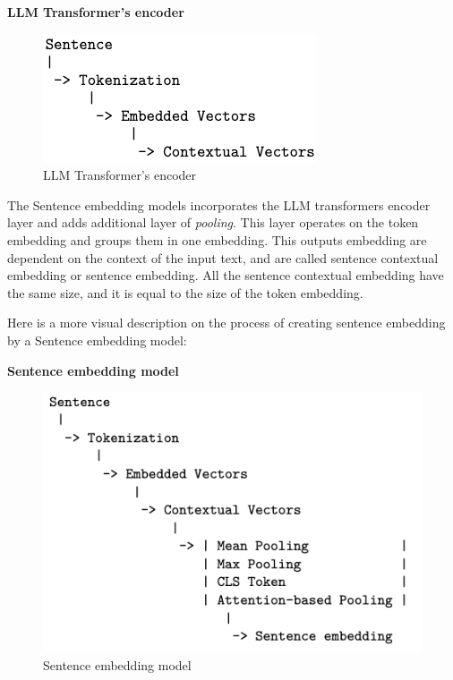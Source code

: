 \documentclass{wseas}
\begin{document}
\textbf{LLM Transformer's encoder}

\begin{figure}[htbp]{}
  \centering
  \includegraphics[width=\linewidth]{resources/v1/transformerEncoder.png}
  \caption{LLM Transformer's encoder}
  \label{fig:encoder_layer_figure}
\end{figure}

The Sentence embedding models incorporates the LLM transformers encoder
layer and adds additional layer of \emph{pooling}. This layer operates
on the token embedding and groups them in one embedding. This outputs
embedding are dependent on the context of the input text, and are called
sentence contextual embedding or sentence embedding. All the sentence
contextual embedding have the same size, and it is equal to the size of
the token embedding.


Here is a more visual description on the process of creating sentence
embedding by a Sentence embedding model:

\textbf{Sentence embedding model}

\begin{figure}[htbp]
  \centering
  \includegraphics[width=\linewidth]{resources/v1/sentenceEmbeddingModelCreation.png}
  \caption{Sentence embedding model}
  \label{fig:sentence_embedding_model_figure}
\end{figure}
\end{document}
